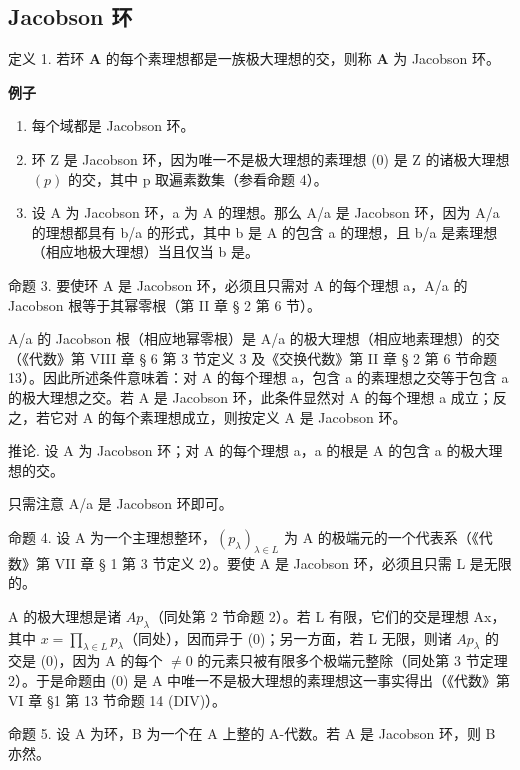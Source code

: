 \subsection{Jacobson 环}

定义 1. 若环 \(\mathbf{A}\) 的每个素理想都是一族极大理想的交，则称 \(\mathbf{A}\) 为 Jacobson 环。

\textbf{例子}\par

\begin{enumerate}
\def\labelenumi{(\arabic{enumi})}
\item
  每个域都是 Jacobson 环。
\item
  环 Z 是 Jacobson 环，因为唯一不是极大理想的素理想 (0) 是 Z 的诸极大理想 \((p)\) 的交，其中 p 取遍素数集（参看命题 4）。
\item
  设 A 为 Jacobson 环，a 为 A 的理想。那么 A/a 是 Jacobson 环，因为 A/a 的理想都具有 b/a 的形式，其中 b 是 A 的包含 a 的理想，且 b/a 是素理想（相应地极大理想）当且仅当 b 是。
\end{enumerate}

命题 3. 要使环 A 是 Jacobson 环，必须且只需对 A 的每个理想 a，A/a 的 Jacobson 根等于其幂零根（第 II 章 § 2 第 6 节）。

A/a 的 Jacobson 根（相应地幂零根）是 A/a 的极大理想（相应地素理想）的交（《代数》第 VIII 章 § 6 第 3 节定义 3 及《交换代数》第 II 章 § 2 第 6 节命题 13）。因此所述条件意味着：对 A 的每个理想 a，包含 a 的素理想之交等于包含 a 的极大理想之交。若 A 是 Jacobson 环，此条件显然对 A 的每个理想 a 成立；反之，若它对 A 的每个素理想成立，则按定义 A 是 Jacobson 环。

推论. 设 A 为 Jacobson 环；对 A 的每个理想 a，a 的根是 A 的包含 a 的极大理想的交。

只需注意 A/a 是 Jacobson 环即可。

命题 4. 设 A 为一个主理想整环，\((p_{\lambda})_{\lambda \in L}\) 为 A 的极端元的一个代表系（《代数》第 VII 章 § 1 第 3 节定义 2）。要使 A 是 Jacobson 环，必须且只需 L 是无限的。

A 的极大理想是诸 \(Ap_{\lambda}\)（同处第 2 节命题 2）。若 L 有限，它们的交是理想 Ax，其中 \(x = \prod_{\lambda \in L} p_{\lambda}\)（同处），因而异于 (0)；另一方面，若 L 无限，则诸 \(Ap_{\lambda}\) 的交是 (0)，因为 A 的每个 \(\neq 0\) 的元素只被有限多个极端元整除（同处第 3 节定理 2）。于是命题由 (0) 是 A 中唯一不是极大理想的素理想这一事实得出（《代数》第 VI 章 §1 第 13 节命题 14 (DIV)）。

命题 5. 设 A 为环，B 为一个在 A 上整的 A-代数。若 A 是 Jacobson 环，则 B 亦然。

